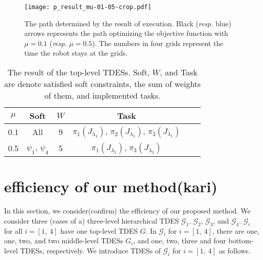 \documentclass[journal,twoside,web]{IEEEtran}
\begin{document}
\begin{figure}
   \centering
   \texttt{[image: p\_result\_mu-01-05-crop.pdf]}
   \caption{The path determined by the result of execution. Black ({\sl resp.} blue) arrows represents the path optimizing the objective function with $\mu=0.1$ ({\sl resp.} $\mu=0.5$). The numbers in four grids represent the time the robot stays at the grids.}
    \label{p:result}
\end{figure}
%
%
\begin{table}
\caption{The result of the top-level TDESs. Soft, $W$, and Task are denote satisfied soft constraints, the sum of weights of them, and implemented tasks.}
\label{tab:p}
\centering
\begin{tabular}{c|c|c|ccc}
 $\mu$ &Soft& $W$&Task\\\hline
0.1& All &9 &  $\pi_1(J_{\lambda_1})$, $\pi_2(J_{\lambda_1})$, $\pi_3(J_{\lambda_1})$\\
0.5& $\psi_1$, $\psi_4$  &5 & $\pi_1(J_{\lambda_1})$, $\pi_3(J_{\lambda_3})$\\
\end{tabular}
\end{table}
%
%
\begin{comment}
%
%
\begin{figure}
   \centering
    \subfigure[The path optimizing the cost function with $\mu=0.1$.]{\hspace{0cm}
      {\texttt{[image: p\_result\_mu-01-crop.pdf]}\hspace{0.0cm}} \label{p:r:01}} \vspace{0.0cm}
      \subfigure[The path optimizing the cost function with $\mu=0.5$.]{\hspace{0cm}      {\texttt{[image: p\_result\_mu-05-crop.pdf]}\hspace{0.0cm}} \label{p:r:05}} \vspace{0.0cm}
    \caption{The path determined by the result of execution. } \label{p:result}
\end{figure}
%
%
%
\end{comment}
%
%
\section{efficiency of our method(kari)}
%
In this section, we consider(confirm) the efficiency of our proposed method.
We consider three (cases of a) three-level hierarchical TDES $\mathcal{G}_1$, $\mathcal{G}_2$, $\mathcal{G}_3$, and $\mathcal{G}_4$.
$\mathcal{G}_i$ for all $i=[1,~4]$ have one top-level TDES $G$.
In $\mathcal{G}_i$ for $i=[1,~4]$, there are one, one, two, and two middle-level TDESs $G_i$, and one, two, three and four bottom-level TDESs, respectively.
We introduce TDESs of $\mathcal{G}_i$ for $i=[1,~4]$ as follows.
\end{document}
